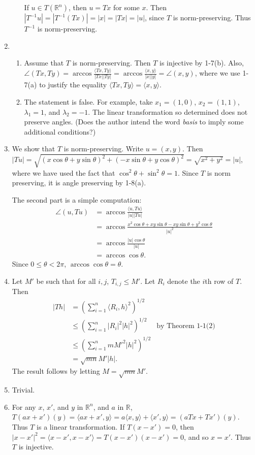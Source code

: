 \documentclass{article}
\begin{document}
\begin{enumerate}[label=\textbf{1-\arabic*.}]
\begin{enumerate}
If $u\in T(\mathbb R^n)$, then $u = Tx$ for some $x$. Then $|T^{-1}u| = |T^{-1}(Tx)| = |x| = |Tx| = |u|$, since $T$ is norm-preserving. Thus $T^{-1}$ is norm-preserving.
\end{enumerate}
\item
\begin{enumerate}
\item Assume that $T$ is norm-preserving. Then $T$ is injective by 1-7(b). Also, $\angle(Tx,Ty) = \arccos\frac{\langle Tx,Ty\rangle}{|Tx||Ty|} = \arccos\frac{\langle x,y\rangle}{|x||y|} = \angle(x,y)$, where we use 1-7(a) to justify the equality $\langle Tx,Ty\rangle = \langle x,y\rangle$.
\item The statement is false. For example, take $x_1 = (1,0)$, $x_2 = (1,1)$, $\lambda_1 = 1$, and $\lambda_2 = -1$. The linear transformation so determined does not preserve angles. (Does the author intend the word \textit{basis} to imply some additional conditions?)
\end{enumerate}
\item We show that $T$ is norm-preserving. Write $u=(x, y)$. Then $|Tu| = \sqrt{(x\cos\theta+y\sin\theta)^2+(-x\sin\theta + y\cos\theta)^2} = \sqrt{x^2+y^2} = |u|$, where we have used the fact that $\cos^2\theta + \sin^2\theta = 1$. Since $T$ is norm preserving, it is angle preserving by 1-8(a).

The second part is a simple computation:
\begin{align*}
\angle(u,Tu) &= \arccos\frac{\langle u,Tu\rangle}{|u||Tu|}\\
	&= \arccos\frac{x^2\cos\theta + xy\sin\theta - xy\sin\theta + y^2\cos\theta}{|u|^2}\\
	&= \arccos\frac{|u|\cos\theta}{|u|}\\
	&= \arccos\cos\theta.
\end{align*}
Since $0 \leq \theta < 2\pi$, $\arccos\cos\theta = \theta$.
\item Let $M'$ be such that for all $i,j$, $T_{i,j} \leq M'$. Let $R_i$ denote the $i$th row of $T$. Then
\begin{align*}
|Th|&=\left(\sum_{i=1}^n \langle R_i,h\rangle^2\right)^{1/2}\\
	&\leq \left(\sum_{i=1}^n |R_i|^2|h|^2\right)^{1/2} &\text{by Theorem 1-1(2)}\\
	&\leq \left(\sum_{i=1}^n mM'^2|h|^2\right)^{1/2}\\
	&= \sqrt{mn}M'|h|.
\end{align*}
The result follows by letting $M=\sqrt{mn}M'$.
\item Trivial.
\item For any $x$, $x'$, and $y$ in $\mathbb R^n$, and $a$ in $\mathbb R$, $T(ax+x')(y) = \langle ax+x',y\rangle = a\langle x,y\rangle + \langle x',y\rangle = (aTx + Tx')(y)$. Thus $T$ is a linear transformation. If $T(x-x')=0$, then $|x-x'|^2 = \langle x-x',x-x'\rangle = T(x-x')(x-x') = 0$, and so $x=x'$. Thus $T$ is injective.


\end{enumerate}
\end{document}
